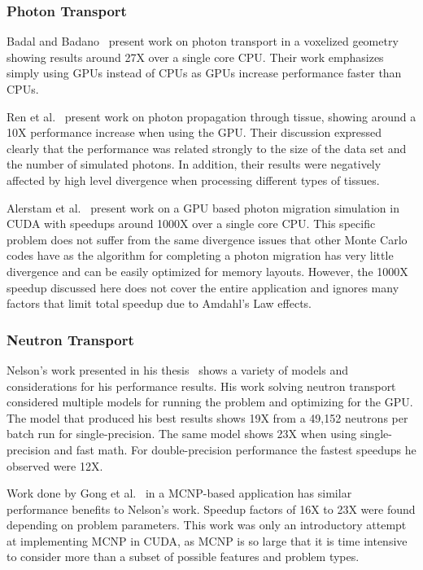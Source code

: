 \subsubsection*{\textbf{Photon Transport}}
%
Badal and Badano~\cite{badal2009accelerating} present work on photon transport in a voxelized geometry showing results around 27X over a single core CPU.
%
Their work emphasizes simply using GPUs instead of CPUs as GPUs increase performance faster than CPUs.
%

%
Ren et al.~\cite{ren2010gpu} present work on photon propagation through tissue, showing around a 10X performance increase when using the GPU.
%
Their discussion expressed clearly that the performance was related strongly to the size of the data set and the number of simulated photons.
%
In addition, their results were negatively affected by high level divergence when processing different types of tissues.
%

%
Alerstam et al.~\cite{alerstam2008parallel} present work on a GPU based photon migration simulation in CUDA with speedups around 1000X over a single core CPU.
%
This specific problem does not suffer from the same divergence issues that other Monte Carlo codes have as the algorithm for completing a photon migration has very little divergence and can be easily optimized for memory layouts.
%
However, the 1000X speedup discussed here does not cover the entire application and ignores many factors that limit total speedup due to Amdahl's Law effects.
%

\subsubsection*{\textbf{Neutron Transport}}

%
Nelson's work presented in his thesis~\cite{nelson2009monte} shows a variety of models and considerations for his performance results.
%
His work solving neutron transport considered multiple models for running the problem and optimizing for the GPU.
%
The model that produced his best results shows 19X from a 49,152 neutrons per batch run for single-precision.
%
The same model shows 23X when using single-precision and fast math.
%
For double-precision performance the fastest speedups he observed were 12X.
%

Work done by Gong et al.~\cite{gong2011accelerating} in a MCNP-based application has similar performance benefits to Nelson's work.
%
Speedup factors of 16X to 23X were found depending on problem parameters.
%
This work was only an introductory attempt at implementing MCNP in CUDA, as MCNP is so large that it is time intensive to consider more than a subset of possible features and problem types.
%

